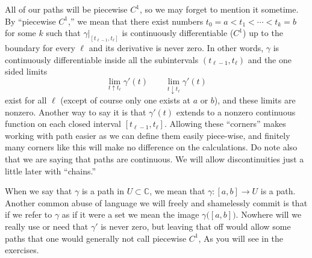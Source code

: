 \documentclass[12pt,openany]{book}
\newcommand{\C}{{\mathbb{C}}}
\theoremstyle{plain}
\theoremstyle{remark}
\theoremstyle{definition}
\theoremstyle{exercise}
\theoremstyle{example}
\begin{document}
All of our paths will be piecewise $C^1$, so we may forget to mention it
sometime.
By ``piecewise $C^1$,''
we mean that there exist numbers $t_0 = a < t_1 < \cdots
< t_k = b$ for some $k$ such that $\gamma|_{[t_{\ell-1},t_\ell]}$ is
continuously differentiable ($C^1$) up to
the boundary for every $\ell$ and its derivative is never zero.
In other words, $\gamma$ is continuously differentiable inside all the
subintervals $(t_{\ell-1},t_\ell)$ and the one sided limits
\begin{equation*}
\lim_{t \uparrow t_\ell} \gamma'(t) \qquad
\lim_{t \downarrow t_\ell} \gamma'(t)
\end{equation*}
exist for all $\ell$ (except of course only one exists at $a$ or $b$),
and these limits are nonzero.
Another way to say it is that $\gamma'(t)$ extends to a nonzero
continuous function on each closed interval $[t_{\ell-1},t_{\ell}]$.
Allowing these ``corners'' makes working with path easier
as we can define them easily piece-wise, and finitely many corners like
this will make no difference on the calculations.
Do note also that we are saying that paths are continuous.  We will allow
discontinuities just a little later with ``chains.''

When we say that $\gamma$ is a path in $U \subset \C$, we mean that
$\gamma \colon [a,b] \to U$ is a path.  Another common abuse of language we
will freely and shamelessly commit is that if we refer to $\gamma$
as if it were a set we mean the image $\gamma\bigl([a,b]\bigr)$.
Nowhere will we really use or need that $\gamma'$ is never zero,
but leaving that off would allow some paths that one would generally not
call piecewise $C^1$,
As you will see in the exercises.
\end{document}
